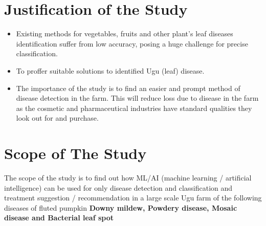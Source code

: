 \section{Justification of the Study}
\begin{itemize}
	\item Existing methods for vegetables, fruits and other plant's leaf diseases identification suffer from low accuracy, posing a huge challenge for precise classification.
	
	\item To proffer suitable solutions to identified Ugu (leaf) disease.
	
	\item The importance of the study is to find an easier and prompt method of disease detection in the farm. This will reduce loss due to disease in the farm as the cosmetic and pharmaceutical industries have standard qualities they look out for and purchase.
\end{itemize}

\section{Scope of The Study}
The scope of the study is to find out how ML/AI (machine learning / artificial intelligence) can be used for only disease detection and classification and treatment suggestion / recommendation in a large scale Ugu farm of the following diseases of fluted pumpkin {\bfseries Downy mildew, Powdery disease, Mosaic disease and Bacterial leaf spot}
